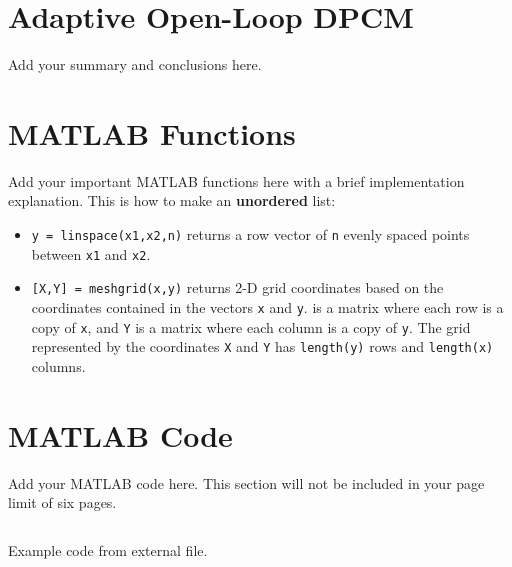 \documentclass{article}
\begin{document}
\section{Adaptive Open-Loop DPCM}
Add your summary and conclusions here.

\printbibliography

\begin{appendices}

\section{MATLAB Functions}
Add your important MATLAB functions here with a brief implementation explanation. This is how to make an \textbf{unordered} list:
\begin{itemize}
    \item \texttt{y = linspace(x1,x2,n)} returns a row vector of \texttt{n} evenly spaced points between \texttt{x1} and \texttt{x2}. 
    \item \texttt{[X,Y] = meshgrid(x,y)} returns 2-D grid coordinates based on the coordinates contained in the vectors \texttt{x} and \texttt{y}.  is a matrix where each row is a copy of \texttt{x}, and \texttt{Y} is a matrix where each column is a copy of \texttt{y}. The grid represented by the coordinates \texttt{X} and \texttt{Y} has \texttt{length(y)} rows and \texttt{length(x)} columns.  
\end{itemize}

\section{MATLAB Code}
Add your MATLAB code here. This section will not be included in your page limit of six pages.

\begin{listing}[h]
\inputminted{matlab}{example.m}
\caption{Example code from external file.}
\label{listing:examplecode}
\end{listing}

\end{appendices}
\end{document}
